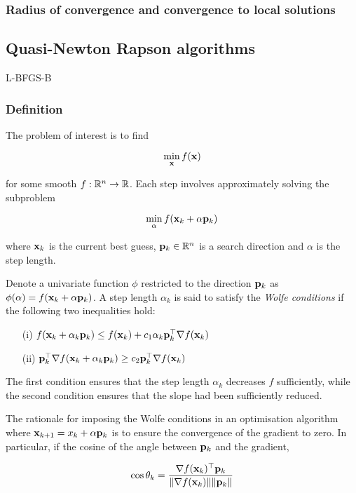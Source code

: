 \documentclass{amsart}[12pt]
\begin{document}
\subsubsection{Radius of convergence and convergence to local solutions}

\subsection{Quasi-Newton Rapson algorithms}
\label{sec:quasi_newton}
L-BFGS-B

\subsubsection{Definition}

The problem of interest is to find

$$
\min_{\bf x} f({\bf x})
$$

for some smooth $f: {\mathbb{R}}^n \to {\mathbb{R}}$. Each step involves approximately solving the subproblem

$$
\min_\alpha f({\bf x}_k + \alpha {\bf p}_k)
$$

where ${\bf x}_k$ is the current best guess, ${\bf p}_k \in {\mathbb{R}}^n$ is a search direction and $\alpha$ is the
step length.

Denote a univariate function $\phi$ restricted to the direction ${\bf p}_k$ as
$\phi(\alpha) = f({\bf x}_k + \alpha {\bf p}_k)$. A step length $\alpha_k$ is said to satisfy the \emph{Wolfe conditions}
if the following two inequalities hold:

\begin{enumerate}
\item[(i)] $f({\bf x}_k + \alpha_k {\bf p}_k) \leq f({\bf x}_k) + c_1 \alpha_k {\bf p}_k^\top \nabla f({\bf x}_k)$ 
\item[(ii)] ${\bf p}_k^\top \nabla f({\bf x}_k + \alpha_k {\bf p}_k) \geq c_2 {\bf p}_k^\top \nabla f({\bf x}_k)$ 
\end{enumerate}

The first condition ensures that the step length $\alpha_k$ decreases $f$ sufficiently, while the second condition
ensures that the slope had been sufficiently reduced.

The rationale for imposing the Wolfe conditions in an optimisation algorithm where
${\bf x}_{k+1} = x_k + \alpha {\bf p}_k$ is to ensure the convergence of the gradient to zero. In particular, if the
cosine of the angle between ${\bf p}_k$ and the gradient,

$$
\cos \theta_k = \frac{\nabla f({\bf x}_k)^\top {\bf p}_k}{\|\nabla f({\bf x}_k)\| \|{\bf p}_k\|}
$$
\end{document}
